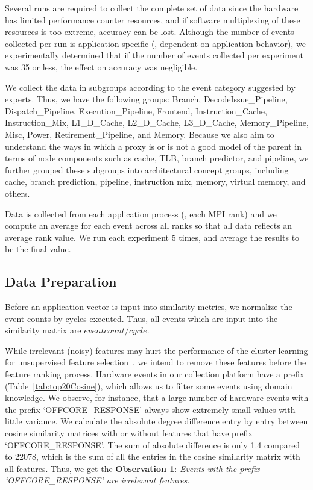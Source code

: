 Several runs are required to collect the complete set of data since the hardware has limited performance counter resources, and if software multiplexing of these resources is too extreme, accuracy can be lost. Although the number of events collected per run is application specific (\ie, dependent on application behavior), we experimentally determined that if the number of events collected per experiment was 35 or less, the effect on accuracy was negligible. 

We collect the data in subgroups according to the event category suggested by experts. Thus, we have the following groups: Branch, DecodeIssue\_Pipeline, Dispatch\_Pipeline, Execution\_Pipeline, Frontend, Instruction\_Cache, Instruction\_Mix, L1\_D\_Cache, L2\_D\_Cache, L3\_D\_Cache, Memory\_Pipeline, Misc, Power, Retirement\_Pipeline, and Memory. Because we also aim to understand the ways in which a proxy is or is not a good model of the parent in terms of node components such as cache, TLB, branch predictor, and pipeline, we further grouped these subgroups into architectural concept groups, including cache, branch prediction, pipeline, instruction mix, memory, virtual memory, and others.

Data is collected from each application process (\ie, each MPI rank) and we compute an average for each event across all ranks so that all data reflects an average rank value. We run each experiment 5 times, and average the results to be the final value.

\subsection{Data Preparation}
\label{sec:prep}
Before an application vector is input into similarity metrics, we normalize the event counts by cycles executed. Thus, all events which are input into the similarity matrix are $eventcount/cycle$.

While irrelevant (noisy) features may hurt the performance of the cluster learning for unsupervised feature selection~\cite{lindenbaum2021differentiable}, we intend to remove these features before the feature ranking process. %
Hardware events in our collection platform have a prefix (Table~\ref{tab:top20Cosine}), which allows us to filter some events using domain knowledge.
We observe, for instance, that a large number of hardware events with the prefix `OFFCORE\_RESPONSE' always show extremely small values with little variance. We calculate the absolute degree difference entry by entry between cosine similarity matrices with or without features that have prefix `OFFCORE\_RESPONSE'. The sum of absolute difference is only 1.4 compared to 22078, which is the sum of all the entries in the cosine similarity matrix with all features. Thus, we get the \textbf{Observation 1}: 
\textit{Events with the prefix `OFFCORE\_RESPONSE' are irrelevant features.} 

